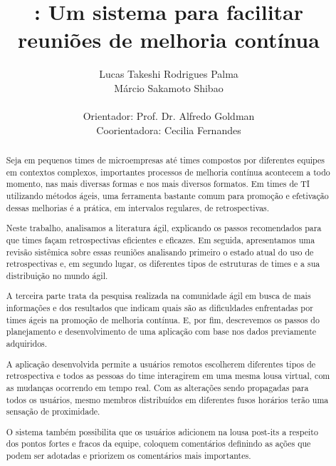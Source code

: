 \documentclass[titlepage, 12pt]{article}
\title{\suricato: Um sistema para facilitar reuniões de melhoria contínua}
\author{Lucas Takeshi Rodrigues Palma\\Márcio Sakamoto Shibao\\ \\Orientador: Prof. Dr. Alfredo Goldman\\Coorientadora: Cecilia Fernandes}
\begin{document}
	

\maketitle

\begin{abstract}
Seja em pequenos times de microempresas até times compostos por diferentes equipes em contextos complexos, importantes processos de melhoria contínua acontecem a todo momento, nas mais diversas formas e nos mais diversos formatos. Em times de TI utilizando métodos ágeis, uma ferramenta bastante comum para promoção e efetivação dessas melhorias é a prática, em intervalos regulares, de retrospectivas.

Neste trabalho, analisamos a literatura ágil, explicando os passos recomendados para que times façam retrospectivas eficientes e eficazes. Em seguida, apresentamos uma revisão sistêmica sobre essas reuniões analisando primeiro o estado atual do uso de retrospectivas e, em segundo lugar, os diferentes tipos de estruturas de times e a sua distribuição no mundo ágil.

A terceira parte trata da pesquisa realizada na comunidade ágil em busca de mais informações e dos resultados que indicam quais são as dificuldades enfrentadas por times ágeis na promoção de melhoria contínua. E, por fim, descrevemos os passos do planejamento e desenvolvimento de uma aplicação com base nos dados previamente adquiridos.

A aplicação desenvolvida permite a usuários remotos escolherem diferentes tipos de retrospectiva e todos as pessoas do time interagirem em uma mesma lousa virtual, com as mudanças ocorrendo em tempo real. Com as alterações sendo propagadas para todos os usuários, mesmo membros distribuídos em diferentes fusos horários terão uma sensação de
proximidade.

O sistema também possibilita que os usuários adicionem na lousa post-its a respeito dos pontos fortes e fracos da equipe, coloquem comentários definindo as ações que podem ser adotadas e priorizem os comentários mais importantes.
 
\end{abstract}
\newpage


\tableofcontents
\newpage
\end{document}
